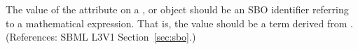 The value of the  attribute on a \AlgebraicRule, \RateRule
or \AssignmentRule object should be an SBO identifier referring to a
mathematical expression.  That is, the value should be a term derived from
\sbomathformula.  (References: SBML L3V1 Section~\ref{sec:sbo}.)
